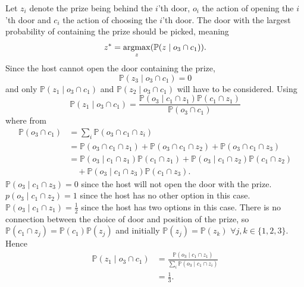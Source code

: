 \begin{example}
	Let $z_i$ denote the prize being behind the $i$'th door, $o_i$ the action of opening the $i$'th door and $c_i$ the action of choosing the $i$'th door. The door with the largest probability of containing the prize should be picked, meaning
	\begin{equation}
		z^*=\operatorname*{argmax}_z(\mathbb{P}(z\mid o_3 \cap c_1)).
	\end{equation}
	Since the host cannot open the door containing the prize, 
	\begin{equation}
		\mathbb{P}(z_3\mid o_3 \cap c_1)=0
	\end{equation}
	 and only $\mathbb{P}(z_1\mid o_3 \cap c_1)$ and $\mathbb{P}(z_2\mid o_3 \cap c_1)$ will have to be considered. Using 
	\begin{equation}
		\mathbb{P}(z_1\mid o_3 \cap c_1) = \frac{\mathbb{P}(o_3\mid c_1 \cap z_1)\mathbb{P}(c_1 \cap z_1)}{\mathbb{P}(o_3 \cap c_1)}
	\end{equation}
	where from 
	\begin{equation}
		\begin{split}
			\mathbb{P}(o_3 \cap c_1)&=\sum_i\mathbb{P}(o_3 \cap c_1 \cap z_i)\\
			&=\mathbb{P}(o_3 \cap c_1 \cap z_1)+\mathbb{P}(o_3 \cap c_1 \cap z_2)+\mathbb{P}(o_3 \cap c_1 \cap z_3)\\
			&= \mathbb{P}(o_3\mid c_1 \cap z_1)\mathbb{P}(c_1 \cap z_1)+\mathbb{P}(o_3\mid c_1 \cap z_2)\mathbb{P}(c_1 \cap z_2)\\
			&\quad+\mathbb{P}(o_3\mid c_1 \cap z_3)\mathbb{P}(c_1 \cap z_3).
		\end{split}
	\end{equation}
	$\mathbb{P}(o_3\mid c_1 \cap z_3)=0$ since the host will not open the door with the prize. $p(o_3\mid c_1 \cap z_2)=1$ since the host has no other option in this case. $\mathbb{P}(o_3\mid c_1 \cap z_1)=\frac{1}{2}$ since the host has two options in this case. There is no connection between the choice of door and position of the prize, so $\mathbb{P}(c_1 \cap z_j)=\mathbb{P}(c_1)\mathbb{P}(z_j)$ and initially $\mathbb{P}(z_j)=\mathbb{P}(z_k)$ $\forall j,k\in \{1,2,3\}$. Hence
	\begin{equation}
		\begin{split}
			\mathbb{P}(z_1\mid o_3 \cap c_1) &= \frac{\mathbb{P}(o_3\mid c_1 \cap z_1)}{\sum_i\mathbb{P}(o_3\mid c_1 \cap z_i)}\\
			&=\frac{1}{3}.
		\end{split}
	\end{equation}

\end{example}

